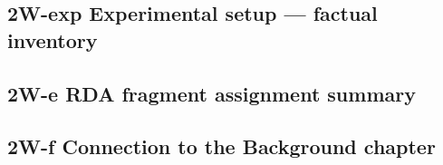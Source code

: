 \vspace{6cm}

\subsection*{2W-exp \quad Experimental setup — factual inventory}

\vspace{6cm}

\subsection*{2W-e \quad RDA fragment assignment summary}

\vspace{6cm}

\subsection*{2W-f \quad Connection to the Background chapter}

\vspace{6cm}